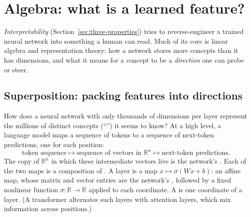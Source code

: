 \section{Algebra: what is a learned feature?}
\label{sec:interp}

\emph{Interpretability} (Section~\ref{sec:three-properties}) tries to reverse-engineer a trained neural network into something a human can read. Much of its core is linear algebra and representation theory: how a network stores more concepts than it has dimensions, and what it means for a concept to be a \emph{direction} one can probe or steer.

\subsection{Superposition: packing features into directions}

How does a neural network with only thousands of dimensions per layer represent
the millions of distinct concepts (``'') it seems to know?
At a high level, a  language model maps a
sequence of tokens to a sequence
of next-token predictions, one for each position: 
\[
   \text{token sequence}
   \longmapsto
   \text{sequence of vectors in }\mathbb R^n
   \longmapsto
   \text{next-token predictions}.
\]
The copy of $\mathbb{R}^n$ in which these intermediate vectors live is the network's
.
Each of the two maps is a composition of . A layer is a map $x\mapsto\sigma(Wx+b)$: an affine map, whose matrix and vector entries are the network's , followed by a fixed nonlinear function $\sigma\colon\mathbb{R}\to\mathbb{R}$ applied to each coordinate. A  is one coordinate of a layer. (A transformer alternates such layers with attention layers, which mix information across positions.)

